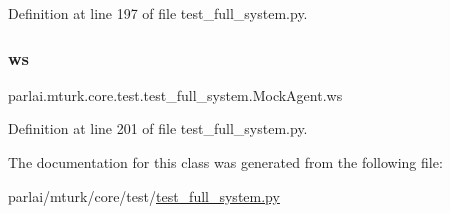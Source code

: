 Definition at line 197 of file test\+\_\+full\+\_\+system.\+py.

\mbox{\label{classparlai_1_1mturk_1_1core_1_1test_1_1test__full__system_1_1MockAgent_a2870f5b01b6d901d44d2dae99ff6a263}} 
\subsubsection{\texorpdfstring{ws}{ws}}
{\footnotesize\ttfamily parlai.\+mturk.\+core.\+test.\+test\+\_\+full\+\_\+system.\+Mock\+Agent.\+ws}



Definition at line 201 of file test\+\_\+full\+\_\+system.\+py.



The documentation for this class was generated from the following file\+:\begin{DoxyCompactItemize}
\item 
parlai/mturk/core/test/\hyperlink{test_2test__full__system_8py}{test\+\_\+full\+\_\+system.\+py}\end{DoxyCompactItemize}
